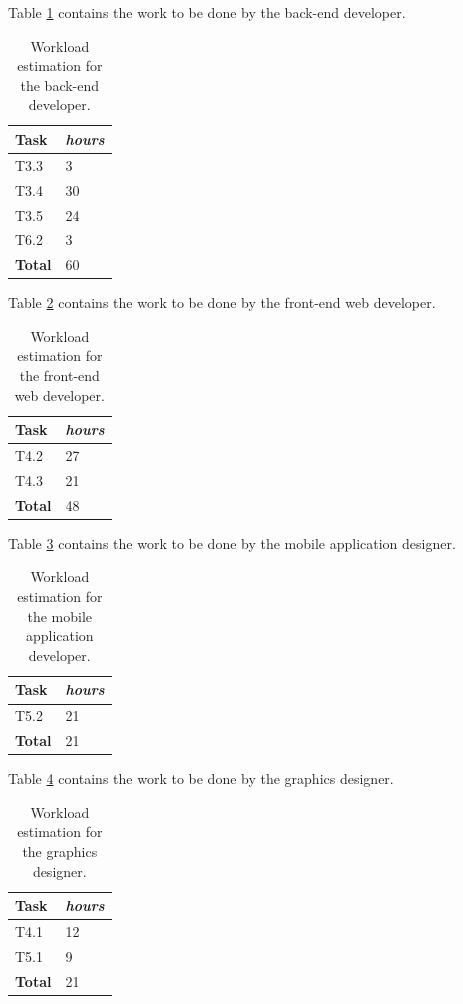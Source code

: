 Table \ref{tab:backend} contains the work to be done by the back-end developer.

\begin{table}[ht]
  \centering
  \caption{Workload estimation for the back-end developer.}\label{tab:backend}
  \begin{tabular}{ll}
    \toprule
      \textbf{Task} & \emph{hours}\\
    \midrule
      T3.3 & 3\\
      T3.4 & 30\\
      T3.5 & 24\\
      T6.2 & 3\\
    \bottomrule
      \textbf{Total} & 60\\
  \end{tabular}
\end{table}

Table \ref{tab:webdev} contains the work to be done by the front-end web developer.

\begin{table}[ht]
  \centering
  \caption{Workload estimation for the front-end web developer.}\label{tab:webdev}
  \begin{tabular}{ll}
    \toprule
      \textbf{Task} & \emph{hours}\\
    \midrule
      T4.2 & 27\\
      T4.3 & 21\\
    \bottomrule
      \textbf{Total} & 48\\
  \end{tabular}
\end{table}

Table \ref{tab:mobdev} contains the work to be done by the mobile application designer.

\begin{table}[ht]
  \centering
  \caption{Workload estimation for the mobile application developer.}\label{tab:mobdev}
  \begin{tabular}{ll}
    \toprule
      \textbf{Task} & \emph{hours}\\
    \midrule
      T5.2 & 21\\
    \bottomrule
      \textbf{Total} & 21\\
  \end{tabular}
\end{table}

Table \ref{tab:designer} contains the work to be done by the graphics designer.

\begin{table}[ht]
  \centering
  \caption{Workload estimation for the graphics designer.}\label{tab:designer}
  \begin{tabular}{ll}
    \toprule
      \textbf{Task} & \emph{hours}\\
    \midrule
      T4.1 & 12\\
      T5.1 & 9\\
    \bottomrule
      \textbf{Total} & 21\\
  \end{tabular}
\end{table}

